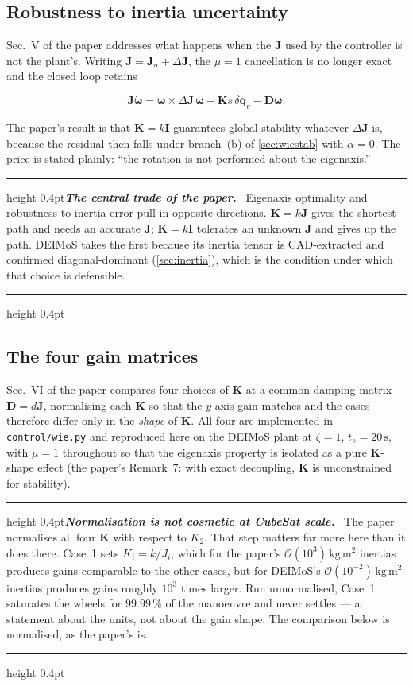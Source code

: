 \documentclass[conference,10pt,a4paper]{IEEEtran}
\newcommand{\remarkrule}{\par\nobreak\vspace{2pt}%
  \hrule height 0.4pt\vspace{4pt}\nobreak}
\newenvironment{keybox}[1][Result]
  {\par\medskip\remarkrule\noindent\small\textbf{\textit{#1.}}\ \ignorespaces}
  {\par\vspace{3pt}\hrule height 0.4pt\par\medskip\ignorespacesafterend}
\newenvironment{cautionbox}[1][Caveat]
  {\par\medskip\remarkrule\noindent\small\textbf{\textit{#1.}}\ \ignorespaces}
  {\par\vspace{3pt}\hrule height 0.4pt\par\medskip\ignorespacesafterend}
\newcommand{\vect}[1]{\bm{#1}}
\newcommand{\mat}[1]{\bm{#1}}
\newcommand{\unit}[1]{\ensuremath{\,\mathrm{#1}}}
\begin{document}
\subsection{Robustness to inertia uncertainty}
\label{sec:wierobust}

Sec.~V of the paper addresses what happens when the $\mat{J}$ used by the
controller is not the plant's. Writing $\mat{J}=\mat{J}_n+\Delta\mat{J}$, the
$\mu=1$ cancellation is no longer exact and the closed loop retains

\begin{equation}
\mat{J}\dot{\vect{\omega}}
 = \vect{\omega}\times\Delta\mat{J}\,\vect{\omega}
 - \mat{K}s\,\delta\vect{q}_v - \mat{D}\vect{\omega} .
\label{eq:robust}
\end{equation}

The paper's result is that $\mat{K}=k\mat{I}$ guarantees global stability
whatever $\Delta\mat{J}$ is, because the residual then falls under
branch~(b) of \cref{sec:wiestab} with $\alpha=0$. The price is stated plainly:
``the rotation is not performed about the eigenaxis.''

\begin{keybox}[The central trade of the paper]
Eigenaxis optimality and robustness to inertia error pull in opposite
directions. $\mat{K}=k\mat{J}$ gives the shortest path and needs an accurate
$\mat{J}$; $\mat{K}=k\mat{I}$ tolerates an unknown $\mat{J}$ and gives up the
path. DEIMoS takes the first because its inertia tensor is CAD-extracted and
confirmed diagonal-dominant (\cref{sec:inertia}), which is the condition under
which that choice is defensible.
\end{keybox}

\subsection{The four gain matrices}
\label{sec:fourcases}

Sec.~VI of the paper compares four choices of $\mat{K}$ at a common damping
matrix $\mat{D}=d\mat{J}$, normalising each $\mat{K}$ so that the $y$-axis gain
matches and the cases therefore differ only in the \emph{shape} of $\mat{K}$.
All four are implemented in \texttt{control/wie.py} and reproduced here on the
DEIMoS plant at $\zeta=1$, $t_s=20\unit{s}$, with $\mu=1$ throughout so that
the eigenaxis property is isolated as a pure $\mat{K}$-shape effect (the
paper's Remark~7: with exact decoupling, $\mat{K}$ is unconstrained for
stability).

\begin{cautionbox}[Normalisation is not cosmetic at CubeSat scale]
The paper normalises all four $\mat{K}$ with respect to $K_2$. That step
matters far more here than it does there. Case~1 sets $K_i=k/J_i$, which for
the paper's $\mathcal{O}(10^3)\unit{kg\,m^2}$ inertias produces gains
comparable to the other cases, but for DEIMoS's
$\mathcal{O}(10^{-2})\unit{kg\,m^2}$ inertias produces gains roughly $10^3$
times larger. Run unnormalised, Case~1 saturates the wheels for $99.99\,\%$ of
the manoeuvre and never settles --- a statement about the units, not about the
gain shape. The comparison below is normalised, as the paper's is.
\end{cautionbox}
\end{document}
